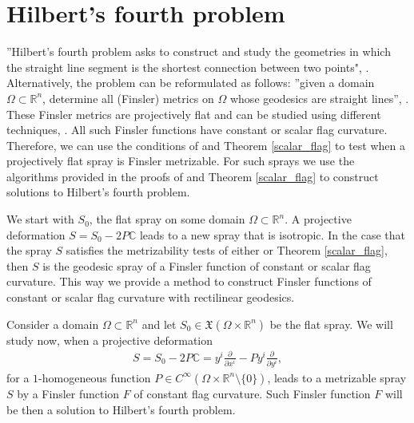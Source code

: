 \documentclass[oneside,english]{amsart}
\numberwithin{equation}{section}
\numberwithin{figure}{section}
\theoremstyle{plain}
\theoremstyle{plain}
\theoremstyle{definition}
\theoremstyle{plain}
\theoremstyle{plain}
\theoremstyle{plain}
\theoremstyle{remark}
\theoremstyle{remark}
\begin{document}
\section{Hilbert's fourth problem}
\label{sec:Hilbert}

''Hilbert's fourth problem asks to construct and study the geometries
in which the straight line segment is the shortest connection between
two points", \cite{Alvarez05}. Alternatively, the problem can be
reformulated as follows: ''given a domain $\Omega \subset \mathbb{R}^n$, determine all (Finsler)
metrics on $\Omega$ whose geodesics are straight lines'',
\cite[p.191]{Shen01}. These Finsler metrics are projectively flat and can
be studied using different techniques, \cite{Crampin11, CMS13, Shen03}. All
such Finsler functions have constant or scalar flag
curvature. Therefore, we can use the conditions of \cite[Thm. 4.1]{BM13}  and Theorem
\ref{scalar_flag} to test when a projectively flat
spray is Finsler metrizable. For such sprays we use the algorithms provided in the
proofs of \cite[Thm. 4.1]{BM13}  and Theorem
\ref{scalar_flag} to construct solutions to Hilbert's fourth problem. 

We start with $S_0$, the flat spray on some domain $\Omega \subset \mathbb{R}^n$. A projective
deformation $S=S_0-2P\mathbb{C}$ leads to a new spray that is
isotropic. In the case that the spray $S$ satisfies the metrizability
tests of either \cite[Thm. 4.1]{BM13} or Theorem
\ref{scalar_flag},  then $S$ is the geodesic spray of a Finsler
function of constant or scalar flag curvature. This way we provide a
method to construct Finsler functions of constant or scalar flag
curvature with rectilinear geodesics. 

Consider a domain $\Omega\subset \mathbb{R}^n$ and let $S_0\in
\mathfrak{X}(\Omega \times \mathbb{R}^n)$ be the flat spray.
We will study now, when a projective deformation 
\begin{eqnarray} S=S_0 -
2P\mathbb{C}=y^i\frac{\partial}{\partial x^i} -
Py^i\frac{\partial}{\partial y^i}, \label{pfspray} \end{eqnarray} for
a $1$-homogeneous function $P \in C^{\infty}(\Omega \times
\mathbb{R}^n\setminus\{0\})$, leads to a metrizable 
spray $S$ by a Finsler function $F$ of constant flag curvature. Such 
Finsler function $F$ will be then a solution to Hilbert's fourth problem.
\end{document}
